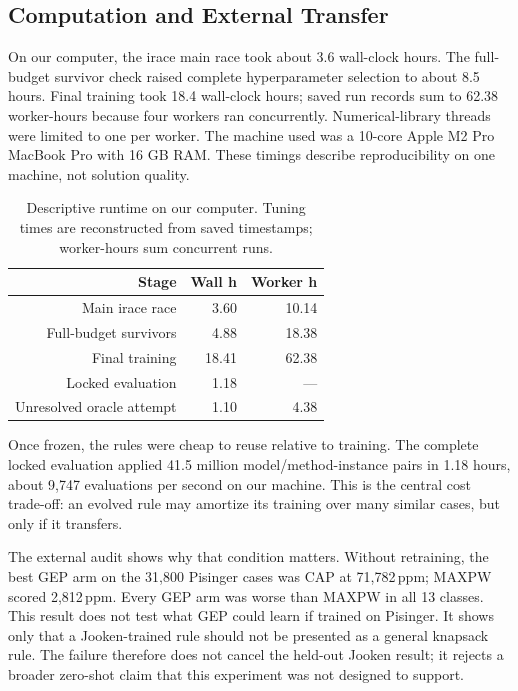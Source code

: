 \documentclass[conference]{IEEEtran}
\newcommand{\ppm}{\,\mathrm{ppm}}
\begin{document}
\subsection{Computation and External Transfer}

On our computer, the irace main race took about 3.6 wall-clock hours. The full-budget survivor check raised complete hyperparameter selection to about 8.5 hours. Final training took 18.4 wall-clock hours; saved run records sum to 62.38 worker-hours because four workers ran concurrently. Numerical-library threads were limited to one per worker. The machine used was a 10-core Apple M2 Pro MacBook Pro with 16 GB RAM. These timings describe reproducibility on one machine, not solution quality.

\begin{table}[htb!]
\caption{Descriptive runtime on our computer. Tuning times are reconstructed from saved timestamps; worker-hours sum concurrent runs.}
\label{table:Runtime}
\centering
\begin{tabular}{rrr}
\toprule
\textbf{Stage} & \textbf{Wall h} & \textbf{Worker h} \\
\midrule
Main irace race & 3.60 & 10.14 \\
Full-budget survivors & 4.88 & 18.38 \\
Final training & 18.41 & 62.38 \\
Locked evaluation & 1.18 & ---\\
Unresolved oracle attempt & 1.10 & 4.38 \\
\bottomrule
\end{tabular}
\end{table}

Once frozen, the rules were cheap to reuse relative to training. The complete locked evaluation applied 41.5 million model/method-instance pairs in 1.18 hours, about 9,747 evaluations per second on our machine. This is the central cost trade-off: an evolved rule may amortize its training over many similar cases, but only if it transfers.

The external audit shows why that condition matters. Without retraining, the best GEP arm on the 31,800 Pisinger cases was CAP at 71,782$\ppm$; MAXPW scored 2,812$\ppm$. Every GEP arm was worse than MAXPW in all 13 classes. This result does not test what GEP could learn if trained on Pisinger. It shows only that a Jooken-trained rule should not be presented as a general knapsack rule. The failure therefore does not cancel the held-out Jooken result; it rejects a broader zero-shot claim that this experiment was not designed to support.
\end{document}
